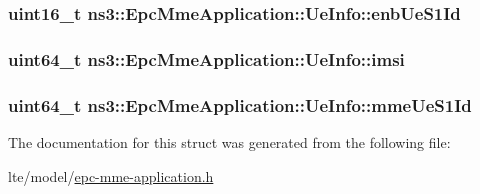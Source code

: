 \subsubsection[{\texorpdfstring{enb\+Ue\+S1\+Id}{enbUeS1Id}}]{\setlength{\rightskip}{0pt plus 5cm}uint16\+\_\+t ns3\+::\+Epc\+Mme\+Application\+::\+Ue\+Info\+::enb\+Ue\+S1\+Id}\hypertarget{structns3_1_1EpcMmeApplication_1_1UeInfo_acfa8ea117a3926934775612d5f98ec86}{}\label{structns3_1_1EpcMmeApplication_1_1UeInfo_acfa8ea117a3926934775612d5f98ec86}
\subsubsection[{\texorpdfstring{imsi}{imsi}}]{\setlength{\rightskip}{0pt plus 5cm}uint64\+\_\+t ns3\+::\+Epc\+Mme\+Application\+::\+Ue\+Info\+::imsi}\hypertarget{structns3_1_1EpcMmeApplication_1_1UeInfo_a116e788e899bbbbaf8fa761e45a02046}{}\label{structns3_1_1EpcMmeApplication_1_1UeInfo_a116e788e899bbbbaf8fa761e45a02046}
\subsubsection[{\texorpdfstring{mme\+Ue\+S1\+Id}{mmeUeS1Id}}]{\setlength{\rightskip}{0pt plus 5cm}uint64\+\_\+t ns3\+::\+Epc\+Mme\+Application\+::\+Ue\+Info\+::mme\+Ue\+S1\+Id}\hypertarget{structns3_1_1EpcMmeApplication_1_1UeInfo_a310f7a7e997ea6dc59ec6cd8b8f434ab}{}\label{structns3_1_1EpcMmeApplication_1_1UeInfo_a310f7a7e997ea6dc59ec6cd8b8f434ab}


The documentation for this struct was generated from the following file\+:\begin{DoxyCompactItemize}
\item 
lte/model/\hyperlink{epc-mme-application_8h}{epc-\/mme-\/application.\+h}\end{DoxyCompactItemize}
